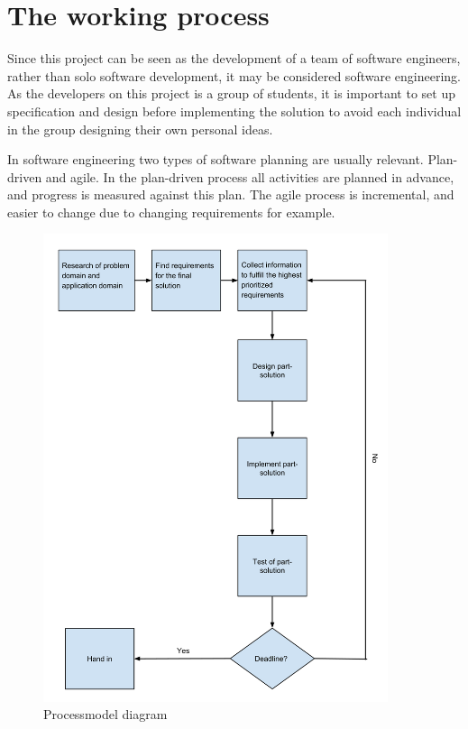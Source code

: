 \chapter{The working process}
Since this project can be seen as the development of a team of software engineers, rather than solo software development, it may be considered software engineering. As the developers on this project is a group of students, it is important to set up specification and design before implementing the solution to avoid each individual in the group designing their own personal ideas.

In software engineering two types of software planning are usually relevant. Plan-driven and agile. In the plan-driven process all activities are planned in advance, and progress is measured against this plan. The agile process is incremental, and easier to change due to changing requirements for example.

\begin{figure}[h!]
\centering
\includegraphics[width=0.9\textwidth]{figures/ProcessmodelDiagram.png}
\caption{Processmodel diagram}
\label{fig:processmodelDiagram}
\end{figure}

